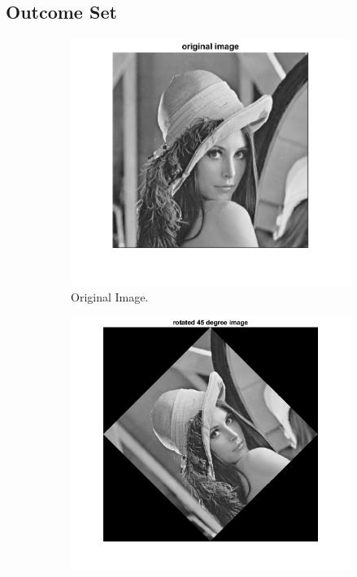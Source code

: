 \documentclass[14pt]{article}
\begin{document}
	\subsection{Outcome Set }
	\newpage
	\begin{figure}[hbt!]
		\centering
		\begin{subfigure}[b]{0.23\linewidth}
			\includegraphics[width=\linewidth]{origin.png}
			\caption{Original Image.}
		\end{subfigure}
		\begin{subfigure}[b]{0.23\linewidth}
			\includegraphics[width=\linewidth]{rot45.png}

\end{subfigure}
\end{figure}
\end{document}
